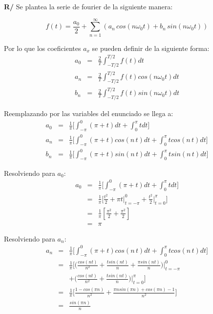 \documentclass[a4paper]{article}
\begin{document}
\textbf{R/} Se plantea la serie de fourier de la siguiente manera:

$$f(t) = \frac{a_0}{2} + \sum_{n=1}^\infty\left(a_n\,cos(n\omega_0t) + b_n\,sin(n\omega_0t)\right)$$

Por lo que los coeficientes $a_x$ se pueden definir de la siguiente forma:
\begin{eqnarray*}
a_0 &=& \frac{2}{T}\int_{-T/2}^{T/2}f(t)dt\\
a_n &=& \frac{2}{T}\int_{-T/2}^{T/2}f(t)cos(n\omega_0t)dt\\
b_n &=& \frac{2}{T}\int_{-T/2}^{T/2}f(t)sin(n\omega_0t)dt
\end{eqnarray*}

Reemplazando por las variables del enunciado se llega a:
\begin{eqnarray*}
a_0 &=& \frac{1}{\pi} \bigg[ \int_{-\pi}^{0}(\pi + t) dt + \int_{0}^{\pi}t dt \bigg] \\
a_n &=&\frac{1}{\pi} \bigg[ \int_{-\pi}^{0}(\pi + t)cos(n\,t) dt + \int_{0}^{\pi}tcos(n\,t) dt \bigg] \\
b_n &=& \frac{1}{\pi} \bigg[ \int_{-\pi}^{0}(\pi + t)sin(n\,t) dt + \int_{0}^{\pi}tsin(n\,t) dt \bigg]
\end{eqnarray*}

Resolviendo para $a_0$:
\begin{eqnarray*}
a_0 &=& \frac{1}{\pi} \bigg[ \int_{-\pi}^{0}(\pi + t) dt + \int_{0}^{\pi}t dt \bigg]\\
&=& \frac{1}{\pi} \bigg[ \frac{t^{2}}{2} + \pi t\bigg|_{t=-\pi}^{0} + \frac{t^{2}}{2}\bigg|_{t=0}^{\pi} \bigg] \\
&=& \frac{1}{\pi} [\frac{\pi^{2}}{2} + \frac{\pi^{2}}{2}]\\
&=& \pi
\end{eqnarray*}

Resolviendo para $a_n$:
\begin{eqnarray*}
a_n &=& \frac{1}{\pi} \bigg[ \int_{-\pi}^{0}(\pi + t)cos(n\,t) dt + \int_{0}^{\pi}tcos(n\,t) dt \bigg] \\
&=& \frac{1}{\pi} \bigg[ \bigg(\frac{cos(n t)}{n^{2}} + \frac{t sin(n t)}{n} + \frac{\pi sin(n t)}{n}\bigg)\bigg|_{t=-\pi}^{0}\\
& & + \bigg(\frac{cos(nt)}{n^{2}} + \frac{tsin(n t)}{n}\bigg)\bigg|_{t=0}^{\pi} \bigg] \\
&=& \frac{1}{\pi} \bigg[ \frac{1 - cos(\pi n)}{n^{2}}+ \frac{\pi n sin(\pi n)+ cos(\pi n) -1}{n^{2}} \bigg]\\
&=& \frac{sin(\pi n)}{n}
\end{eqnarray*}
\end{document}
